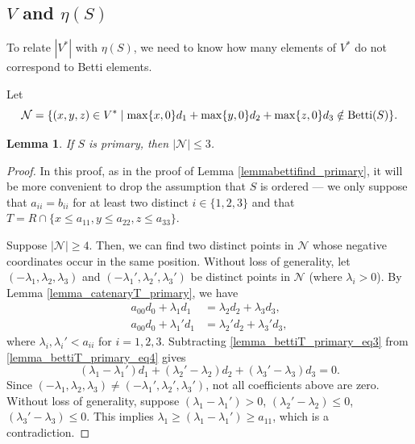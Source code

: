 \documentclass[12pt]{article}
\newtheorem{lemma}[thm]{Lemma}
\theoremstyle{remark}
\begin{document}
\subsection{$V$ and $\eta(S)$}
To relate $|V^*|$ with $\eta(S)$, we need to know how many elements of $V^*$ do not correspond to Betti elements. 

Let
$$ \mathcal{N} = \{ (x,y,z) \in V^* \mid  \max\{ x,0\} d_1 + \max\{y,0\}d_2 + \max\{z,0\}d_3 \notin \textup{Betti}(S)  \}.$$

\begin{lemma}\label{lemma_bettiT_primary}
     If $S$ is primary, then $|\mathcal{N}| \leq 3$.
\end{lemma}
\begin{proof} 
 

In this proof, as in the proof of Lemma \ref{lemmabettifind_primary}, it will be more convenient to drop the assumption that $S$ is ordered --- we only suppose that $a_{ii}=b_{ii}$ for at least two distinct $i \in \{1,2,3\}$ and that $T = R \cap \{x \leq a_{11},y\leq a_{22}, z \leq a_{33}\}$. 

Suppose $|\mathcal{N}| \geq 4$. Then, we can find two distinct points in $\mathcal{N}$ whose negative coordinates occur in the same position. Without loss of generality, let $(-\lambda_1,\lambda_2,\lambda_3)$ and $(-\lambda_1',\lambda_2',\lambda_3')$ be distinct points in $\mathcal{N}$ (where $\lambda_i>0$). By Lemma \ref{lemma_catenaryT_primary}, we have 
\begin{align}
    a_{00}d_0 + \lambda_1d_1 &=  \lambda_2d_2 + \lambda_3d_3,  \label{lemma_bettiT_primary_eq3} \\
    a_{00}d_0 + \lambda_1'd_1 &=  \lambda_2'd_2 + \lambda_3'd_3, \label{lemma_bettiT_primary_eq4}
\end{align}
where $ \lambda_i,\lambda_i' < a_{ii}$ for $i = 1,2,3$. Subtracting \eqref{lemma_bettiT_primary_eq3} from \eqref{lemma_bettiT_primary_eq4} gives 
\begin{equation}
    (\lambda_1-\lambda_1')d_1 + (\lambda_2'-\lambda_2)d_2 + (\lambda_3'-\lambda_3)d_3 = 0.
\end{equation}
Since $(-\lambda_1,\lambda_2,\lambda_3) \neq (-\lambda_1',\lambda_2',\lambda_3')$, not all coefficients above are zero. Without loss of generality, suppose $(\lambda_1-\lambda_1') > 0$, $(\lambda_2'-\lambda_2) \leq 0$, $(\lambda_3'-\lambda_3) \leq 0$. This implies $\lambda_1 \geq (\lambda_1-\lambda_1') \geq a_{11}$, which is a contradiction. 
\end{proof}
\end{document}
